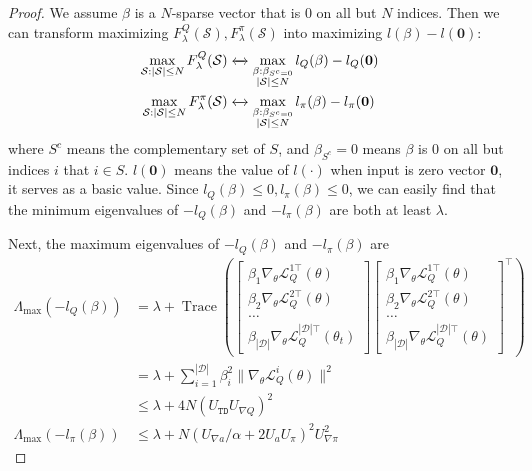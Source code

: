 \begin{proof}
We assume $\beta$ is a $N$-sparse vector that is 0 on all but $N$ indices.
Then we can transform maximizing $F^Q_\lambda(\mathcal{S}), F^\pi_\lambda(\mathcal{S})$ into maximizing $l(\beta)-l(\mathbf{0})$:
\begin{equation}
\begin{aligned}
    \max_{\mathcal{S}:|\mathcal{S}| \leq N} F^Q_\lambda(\mathcal{S}) &\xleftrightarrow{} \max_{\substack{\beta:\beta_{S^c=0} \\|\mathcal{S}|\leq N}} l_Q(\mathbf{\beta})-l_Q(\mathbf{0}) \\
    \max_{\mathcal{S}:|\mathcal{S}| \leq N} F^\pi_\lambda(\mathcal{S}) &\xleftrightarrow{} \max_{\substack{\beta:\beta_{S^c=0} \\|\mathcal{S}|\leq N}} l_\pi(\mathbf{\beta})-l_\pi(\mathbf{0})
\end{aligned}
\end{equation}
where ${S^c}$ means the complementary set of $S$, and $\beta_{S^c}=0$ means $\beta$ is 0 on all but indices $i$ that $i \in S$. 
$l(\mathbf{0})$ means the value of $l(\cdot)$ when input is zero vector $\mathbf{0}$, it serves as a basic value.
Since $l_Q(\beta)\leq 0, l_\pi(\beta) \leq 0$,  we can easily find that the minimum eigenvalues of $-l_Q(\beta)$ and $-l_\pi(\beta)$ are both at least $\lambda$. 

Next, the maximum eigenvalues of $-l_Q(\beta)$ and $-l_\pi(\beta)$ are
\begin{equation}
\begin{aligned}
\Lambda_{\max}(-l_Q(\beta))&=
\lambda+\operatorname{Trace}\left(\left[\begin{array}{c}
\beta_1\nabla_\theta \mathcal L_Q^{1 \top}\left(\theta\right) \\
\beta_2\nabla_\theta \mathcal L_Q^{2 \top}\left(\theta\right) \\
\ldots\\
\beta_{|\mathcal{D}|}\nabla_\theta \mathcal L_Q^{|\mathcal{D}| \top}\left(\theta_t\right)
\end{array}\right]\left[\begin{array}{c}
\beta_1\nabla_\theta \mathcal L_Q^{1 \top}\left(\theta\right) \\
\beta_2\nabla_\theta \mathcal L_Q^{2 \top}\left(\theta\right) \\
\ldots \\
\beta_{|\mathcal{D}|}\nabla_\theta \mathcal L_Q^{|\mathcal{D}| \top}\left(\theta\right)
\end{array}\right]^{\top}\right)    \\
&=\lambda + \sum_{i=1}^{{|\mathcal{D}|}} \beta_i^2 \| \nabla_\theta \mathcal L_Q^{i}(\theta) \|^2\\ &\leq \lambda+4 N (U_\mathtt{TD}U_{\nabla Q})^2 \\
\Lambda_{\max}(-l_\pi(\beta))&\leq \lambda + N(U_{\nabla a}/\alpha+2U_a U_\pi)^2 U_{\nabla\pi}^2
\end{aligned}
\end{equation}


\end{proof}
